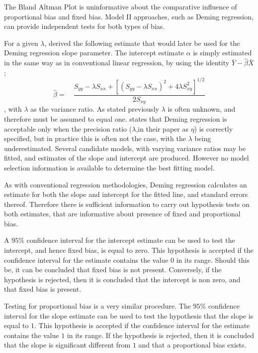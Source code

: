 \documentclass[12pt, a4paper]{report}
\theoremstyle{plain}
\theoremstyle{definition}
\theoremstyle{remark}
\begin{document}
	The Bland Altman Plot is uninformative about the comparative influence of proportional bias and fixed bias. Model II approaches, such as Deming regression,  can provide independent tests for
	both types of bias.
	
	For a given $\lambda$, \citet{Kummel} derived the following estimate that would later be used for the Deming regression slope
	parameter. The intercept estimate $\alpha$ is simply estimated in the same way as in conventional linear
	regression, by using the identity $\bar{Y}-\hat{\beta}\bar{X}$;
	\begin{equation}
		\hat{\beta} =\quad \frac{S_{yy} - \lambda S_{xx}+[(S_{yy} -
			\lambda S_{xx})^{2}+ 4\lambda S^{2}_{xy}]^{1/2}}{2S_{xy}}
	\end{equation},
	with $\lambda$ as the variance ratio. As stated previously $\lambda$ is often unknown, and therefore must be assumed to equal one. \citet{CarollRupert} states that Deming
	regression is acceptable only when the precision ratio ($\lambda$,in their paper as $\eta$) is correctly specified, but in practice this is often not the case, with the $\lambda$ being underestimated. Several candidate models, with varying variance ratios may be fitted, and estimates of the slope and intercept are produced. However no model selection information is available to determine the best fitting model.
	
	As with conventional regression methodologies, Deming regression calculates an estimate for both the slope and intercept for the
	fitted line, and standard errors thereof. Therefore there is sufficient information to carry out hypothesis tests on both
	estimates, that are informative about presence of fixed and proportional bias.
	
	A $95\%$ confidence interval for the intercept estimate can be used to test the intercept, and hence fixed bias, is equal to
	zero. This hypothesis is accepted if the confidence interval for the estimate contains the value $0$ in its range. Should this be,
	it can be concluded that fixed bias is not present. Conversely, if the hypothesis is rejected, then it is concluded that the
	intercept is non zero, and that fixed bias is present.
	
	Testing for proportional bias is a very similar procedure. The
	$95\%$ confidence interval for the slope estimate can be used to
	test the hypothesis that the slope is equal to $1$. This
	hypothesis is accepted if the confidence interval for the estimate
	contains the value $1$ in its range. If the hypothesis is
	rejected, then it is concluded that the slope is significant
	different from $1$ and that a proportional bias exists.
	
\end{document}
